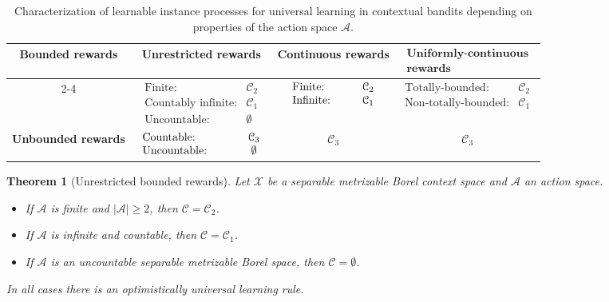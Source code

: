 \documentclass[aos]{imsart}
\theoremstyle{plain}
\newtheorem{theorem}{Theorem}[section]
\theoremstyle{remark}
\newcommand{\Acal}{\mathcal{A}}
\newcommand{\Ccal}{\mathcal{C}}
\newcommand{\Xcal}{\mathcal{X}}
\newcommand{\1}{\mathbbm{1}}%
\begin{document}
\begin{table}
\caption{Characterization of learnable instance processes for universal learning in contextual bandits depending on properties of the action space $\Acal$.}
\label{table:summary_of_results}

\begin{tabular}{|c|c |c |c|} 
 \hline
 \multirow{4}{*}{ \textbf{Bounded rewards} } & \textbf{Unrestricted rewards} & \textbf{Continuous rewards} & $\begin{array}{c}
    \textbf{Uniformly-continuous} \\
     \textbf{rewards}
 \end{array}$\\ [0.5ex] 
 \cline{2-4} 
 &
 $\begin{array}{lc}
      \text{Finite:}& \Ccal_2  \\
      \text{Countably infinite:}& \Ccal_1  \\
      \text{Uncountable:}& \emptyset
 \end{array}$
 &$\begin{array}{l p{0.3cm} c}
      \text{Finite:}&& \Ccal_2  \\
      \text{Infinite:}&& \Ccal_1
 \end{array}$
 &$\begin{array}{lc}
      \text{Totally-bounded:}& \Ccal_2  \\
      \text{Non-totally-bounded:}& \Ccal_1
 \end{array}$ \\ 
 \hline \hline
  \textbf{Unbounded rewards} & $\begin{array}{l p{0.6cm} c}
      \text{Countable:}&& \Ccal_3  \\
      \text{Uncountable:}&& \emptyset
 \end{array}$
 &$\Ccal_3$
 &$\Ccal_3$ \\ 
 \hline
 
\end{tabular}

\end{table}





\begin{theorem}[Unrestricted bounded rewards]\label{thm:unrestricted_rewards}
    Let $\Xcal$ be a separable metrizable Borel context space and $\Acal$ an action space.
    \begin{itemize}
        \item If $\Acal$ is finite and $|\Acal|\geq 2$, then $\Ccal = \Ccal_2$.
        \item If $\Acal$ is infinite and countable, then $\Ccal= \Ccal_1$.
        \item If $\Acal$ is an uncountable separable metrizable Borel space, then $\Ccal = \emptyset$.
    \end{itemize}
    In all cases there is an optimistically universal learning rule.
\end{theorem}
\end{document}
